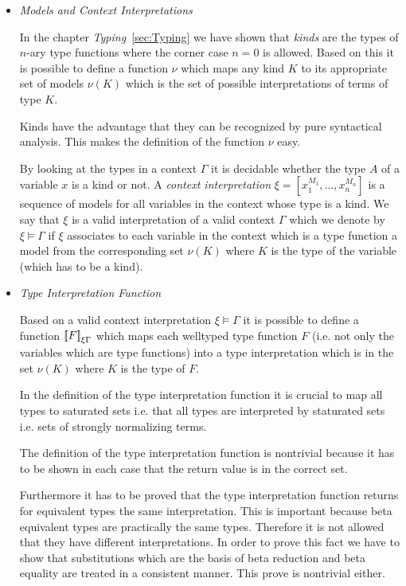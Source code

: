 \begin{itemize}
    \item \emph{Models and Context Interpretations}

        In the chapter \emph{Typing}~\ref{sec:Typing} we have shown that
        \emph{kinds} are the types of $n$-ary type functions where the corner
        case $n = 0$ is allowed. Based on this it is possible to define a
        function $\nu$ which maps any kind $K$ to its appropriate set of models
        $\nu(K)$ which is the set of possible interpretations of terms of type
        $K$.

        Kinds have the advantage that they can be recognized by pure syntactical
        analysis. This makes the definition of the function $\nu$ easy.

        By looking at the types in a context $\Gamma$ it is decidable whether
        the type $A$ of a variable $x$ is a kind or not. A \emph{context
        interpretation} $\xi = [x_1^{M_1}, \ldots, x_n^{M_n}]$ is a sequence of
        models for all variables in the context whose type is a kind. We say
        that $\xi$ is a valid interpretation of a valid context $\Gamma$ which
        we denote by $\xi \vDash \Gamma$ if $\xi$ associates to each variable in
        the context which is a type function a model from the corresponding set
        $\nu(K)$ where $K$ is the type of the variable (which has to be a kind).

    \item \emph{Type Interpretation Function}

        Based on a valid context interpretation $\xi \vDash \Gamma$ it is
        possible to define a function ${{{[\![} F {]\!]}}_{\xi\Gamma}}$ which maps each
        welltyped type function $F$ (i.e. not only the variables which are type
        functions) into a type interpretation which is in the set $\nu(K)$ where
        $K$ is the type of $F$.

        In the definition of the type interpretation function it is crucial to
        map all types to saturated sets i.e. that all types are interpreted by
        staturated sets i.e. sets of strongly normalizing terms.

        The definition of the type interpretation function is nontrivial because
        it has to be shown in each case that the return value is in the correct
        set.

        Furthermore it has to be proved that the type interpretation function
        returns for equivalent types the same interpretation. This is important
        because beta equivalent types are practically the same types. Therefore
        it is not allowed that they have different interpretations. In order to
        prove this fact we have to show that substitutions which are the basis
        of beta reduction and beta equality are treated in a consistent manner.
        This prove is nontrivial either.



\end{itemize}
